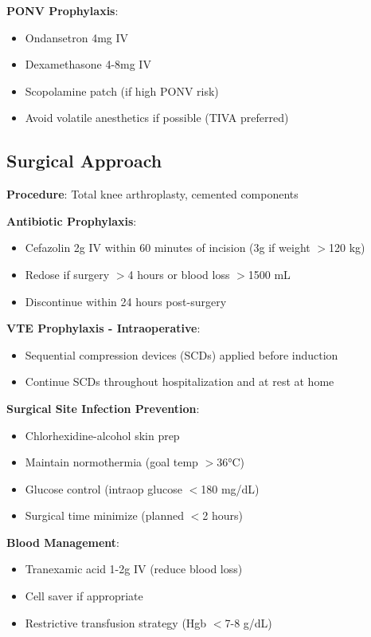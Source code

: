 \documentclass[11pt,letterpaper]{article}
\begin{document}
\textbf{PONV Prophylaxis}:
\begin{itemize}[leftmargin=*]
    \item Ondansetron 4mg IV
    \item Dexamethasone 4-8mg IV
    \item Scopolamine patch (if high PONV risk)
    \item Avoid volatile anesthetics if possible (TIVA preferred)
\end{itemize}

\subsection*{Surgical Approach}

\textbf{Procedure}: Total knee arthroplasty, cemented components

\textbf{Antibiotic Prophylaxis}:
\begin{itemize}[leftmargin=*]
    \item Cefazolin 2g IV within 60 minutes of incision (3g if weight $>$120 kg)
    \item Redose if surgery $>$4 hours or blood loss $>$1500 mL
    \item Discontinue within 24 hours post-surgery
\end{itemize}

\textbf{VTE Prophylaxis - Intraoperative}:
\begin{itemize}[leftmargin=*]
    \item Sequential compression devices (SCDs) applied before induction
    \item Continue SCDs throughout hospitalization and at rest at home
\end{itemize}

\textbf{Surgical Site Infection Prevention}:
\begin{itemize}[leftmargin=*]
    \item Chlorhexidine-alcohol skin prep
    \item Maintain normothermia (goal temp $>$36°C)
    \item Glucose control (intraop glucose $<$180 mg/dL)
    \item Surgical time minimize (planned $<$2 hours)
\end{itemize}

\textbf{Blood Management}:
\begin{itemize}[leftmargin=*]
    \item Tranexamic acid 1-2g IV (reduce blood loss)
    \item Cell saver if appropriate
    \item Restrictive transfusion strategy (Hgb $<$7-8 g/dL)
\end{itemize}
\end{document}
